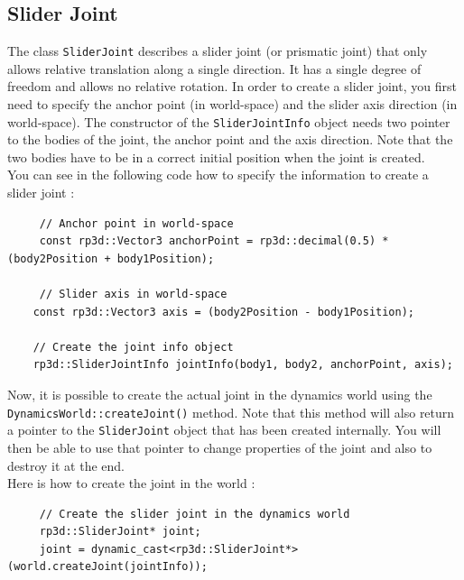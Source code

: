 \documentclass[a4paper,12pt]{article}
\begin{document}
    \subsection{Slider Joint}

    The class \texttt{SliderJoint} describes a slider joint (or prismatic joint) that only allows relative translation along a single direction. It has a single degree of freedom and allows no
    relative rotation. In order to create a slider joint, you first need to specify the anchor point (in world-space) and the slider axis direction (in world-space). The constructor of the
    \texttt{SliderJointInfo} object needs two pointer to the bodies of the joint, the anchor point and the axis direction. Note that the two bodies have to be in a correct initial position when
    the joint is created. \\

    You can see in the following code how to specify the information to create a slider joint : \\

    \begin{lstlisting}
     // Anchor point in world-space
     const rp3d::Vector3 anchorPoint = rp3d::decimal(0.5) * (body2Position + body1Position);

     // Slider axis in world-space
    const rp3d::Vector3 axis = (body2Position - body1Position);

    // Create the joint info object
    rp3d::SliderJointInfo jointInfo(body1, body2, anchorPoint, axis);
  \end{lstlisting}

    \vspace{0.6cm}

    Now, it is possible to create the actual joint in the dynamics world using the \texttt{DynamicsWorld::createJoint()} method.
    Note that this method will also return a pointer to the \texttt{SliderJoint} object that has been created internally. You will then
    be able to use that pointer to change properties of the joint and also to destroy it at the end. \\

    Here is how to create the joint in the world : \\

    \begin{lstlisting}
     // Create the slider joint in the dynamics world
     rp3d::SliderJoint* joint;
     joint = dynamic_cast<rp3d::SliderJoint*>(world.createJoint(jointInfo));
  \end{lstlisting}
\end{document}
